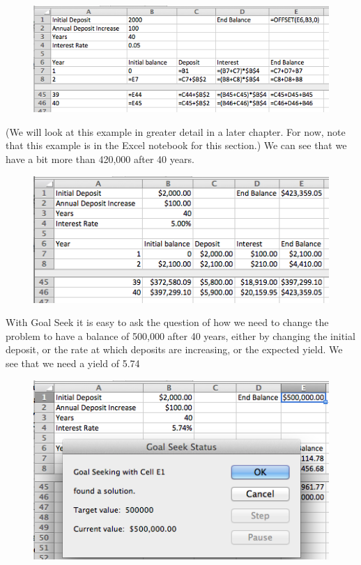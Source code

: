 \documentclass[10pt,]{book}
\theoremstyle{plain}
\theoremstyle{definition}
\theoremstyle{definition}
\begin{document}
  \leavevmode%
\begin{figure}
\centering
\includegraphics[width=0.8\linewidth]{images/sec1-6-8.png}
\end{figure}
 

%
\par

(We will look at this example in greater detail in a later chapter.  For now, note that this example is in the Excel notebook for this section.)  We can see that we have a bit more than \textdollar{}420,000 after 40 years.
 
  \leavevmode%
\begin{figure}
\centering
\includegraphics[width=0.8\linewidth]{images/sec1-6-9.png}
\end{figure}
 

%
\par

With Goal Seek it is easy to ask the question of how we need to change the problem to have a balance of \textdollar{}500,000 after 40 years, either by changing the initial deposit, or the rate at which deposits are increasing, or the expected yield.  We see that we need a yield of 5.74%

  \leavevmode%
\begin{figure}
\centering
\includegraphics[width=0.8\linewidth]{images/sec1-6-10.png}
\end{figure}
 
\end{document}
